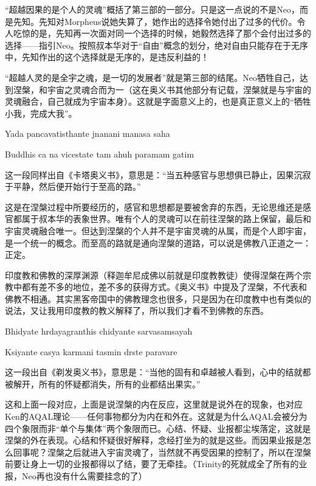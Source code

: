 \documentclass[UTF8]{ctexart}
\newenvironment{myquote}{\color{green} \setlength{\leftskip}{6em} \setlength{\rightskip}{4em} \setlength{\parindent}{-2em}}{\par}
\begin{document}
“超越因果的是个人的灵魂”概括了第三部的一部分。只是这一点说的不是Neo，而是先知。先知对Morpheus说她失算了，她作出的选择令她付出了过多的代价。令人吃惊的是，先知再一次面对同一个选择的时候，她毅然选择了那个会付出过多的选择——指引Neo。按照叔本华对于“自由”概念的划分，绝对自由只能存在于无序中，先知作出的这个选择就是无序的，是违反利益的！

“超越人灵的是全宇之魂，是一切的发展者”就是第三部的结尾。Neo牺牲自己，达到涅槃，和宇宙之灵魂合而为一（这在奥义书其他部分有记载，涅槃就是与宇宙的灵魂融合，自己就成为宇宙本身）。这就是字面意义上的，也是真正意义上的“牺牲小我，完成大我”。

\begin{myquote}
Yada pancavatisthante jnanani manasa saha

Buddhis ca na vicestate tam ahuh paramam gatim
\end{myquote}

这一段同样出自《卡塔奥义书》，意思是：“当五种感官与思想俱已静止，因果沉寂于平静，然后便开始行于至高的路。”

这是在涅槃过程中所要经历的，感官和思想都是要被舍弃的东西，无论思维还是感官都属于叔本华的表象世界。唯有个人的灵魂可以在前往涅槃的路上保留，最后和宇宙灵魂融合唯一。但达到涅槃的个人并不是宇宙灵魂的从属，而是个人即宇宙，是一个统一的概念。而至高的路就是通向涅槃的道路，可以说是佛教八正道之一：正定。

印度教和佛教的深厚渊源（释迦牟尼成佛以前就是印度教教徒）使得涅槃在两个宗教中都有差不多的地位，差不多的获得方式。《奥义书》中提及了涅槃，不代表和佛教不相通。其实黑客帝国中的佛教理念也很多，只是因为在印度教中也有类似的说法，又让我用印度教的教义解释了，所以我们才看不到佛教的东西。

\begin{myquote}
Bhidyate hrdayagranthis chidyante sarvasamsayah

Ksiyante casya karmani tasmin drste paravare
\end{myquote}

这一段出自《剃发奥义书》，意思是：“当他的固有和卓越被人看到，心中的结就都被解开，所有的怀疑都消失，所有的业都结出果实。”

这和上面一段对应，上面是说涅槃的内在反应，这里就是说外在的现象，也对应Ken的AQAL理论——任何事物都分为内在和外在。这就是为什么AQAL会被分为四个象限而非“单个与集体”两个象限而已。心结、怀疑、业报都尘埃落定，这就是涅槃的外在表现。心结和怀疑很好解释，念经打坐为的就是这些。而因果业报是怎么回事呢？涅槃之后就进入宇宙灵魂了，当然就不再受因果的控制了，所以在涅槃前要让身上一切的业报都得以了结，要了无牵挂。（Trinity的死就成全了所有的业报，Neo再也没有什么需要挂念的了）
\end{document}
